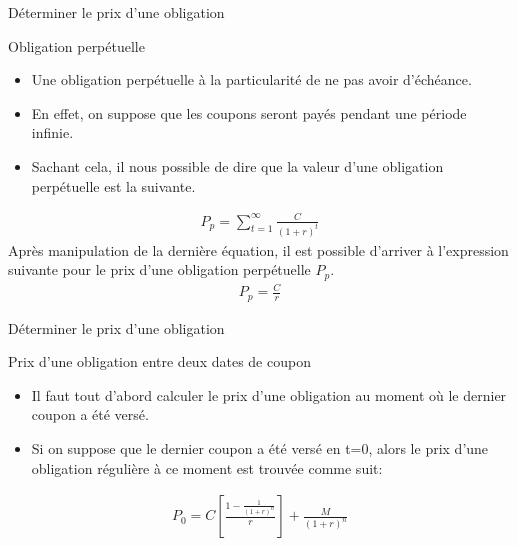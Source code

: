 \documentclass[11pt]{beamer}
\begin{document}
\begin{frame}{Déterminer le prix d'une obligation}
\begin{block}{Obligation perpétuelle}
\begin{itemize}
\item Une obligation perpétuelle à la particularité de ne pas avoir d'échéance. 
\item En effet, on suppose que les coupons seront payés pendant une période infinie. 
\item Sachant cela,  il nous possible de dire que la valeur d'une obligation perpétuelle est la suivante.
\end{itemize}
\begin{align*}
P_{p}=\sum_{t=1}^{\infty} \frac{C}{(1+r)^t}
\end{align*} 
Après manipulation de la dernière équation, il est possible d'arriver à l'expression suivante  pour le prix d'une obligation perpétuelle $P_p$.
\begin{align*}
P_p=\frac{C}{r}
\end{align*}
\end{block}
\end{frame}

\begin{frame}{Déterminer le prix d'une obligation}
\begin{block}{Prix d'une obligation entre deux dates de coupon}
\begin{itemize}
\item Il faut tout d'abord calculer le prix d'une obligation au moment où le dernier coupon a été versé. 
\item Si on suppose que le dernier coupon a été versé en t=0, alors le prix d'une obligation régulière à ce moment est trouvée comme suit:
\end{itemize}
\begin{align*}
P_0=C \left[ \frac{1-\frac{1}{(1+r)^n}}{r} \right]+\frac{M}{(1+r)^n}
\end{align*}
\end{block}
\end{frame}
\end{document}
